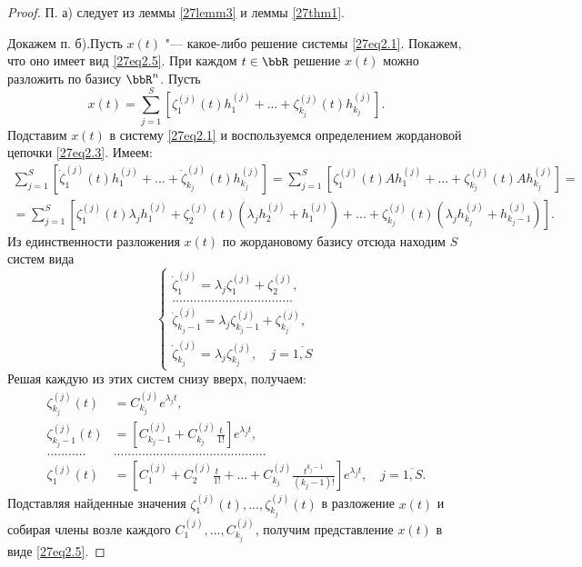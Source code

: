 \begin{proof}
П. а) следует из леммы \ref{27lemm3} и леммы \ref{27thm1}. 

Докажем п. б).Пусть $x(t)$ "--- какое-либо решение системы \eqref{27eq2.1}. Покажем, что оно имеет вид \eqref{27eq2.5}. При каждом $t\in\bbR$ решение $x(t)$ можно разложить по базису $\bbR^n$. Пусть
$$
x(t)=\sum\limits_{j=1}^S\left[\zeta_1^{(j)}(t)h_1^{(j)}+...+\zeta_{k_j}^{(j)}(t)h_{k_j}^{(j)}\right].
$$
Подставим $x(t)$ в систему \eqref{27eq2.1} и воспользуемся определением жордановой цепочки \eqref{27eq2.3}. Имеем:
\begin{multline*}
\sum\limits_{j=1}^S\left[\dot\zeta_1^{(j)}(t)h_1^{(j)}+...+\dot\zeta_{k_j}^{(j)}(t)h_{k_j}^{(j)}\right]=\sum\limits_{j=1}^S\left[\zeta_1^{(j)}(t)Ah_1^{(j)}+...+\zeta_{k_j}^{(j)}(t)Ah_{k_j}^{(j)}\right]=\\=\sum\limits_{j=1}^S\left[\zeta_1^{(j)}(t)\lambda_jh_1^{(j)}+\zeta_2^{(j)}(t)\left(\lambda_jh_2^{(j)}+h_1^{(j)}\right)+...+\zeta_{k_j}^{(j)}(t)\left(\lambda_jh_{k_j}^{(j)}+h_{k_j-1}^{(j)}\right)\right].
\end{multline*}
Из единственности разложения $x(t)$ по жордановому базису отсюда находим $S$ систем вида
$$
\begin{cases}
\dot{\zeta}_1^{(j)}=\lambda_j\zeta_1^{(j)}+\zeta_2^{(j)},\\
..................................\\
\dot{\zeta}_{k_j-1}^{(j)}=\lambda_j\zeta_{k_j-1}^{(j)}+\zeta_{k_j}^{(j)},\\
\dot{\zeta}_{k_j}^{(j)}=\lambda_j\zeta_{k_j}^{(j)},\quad j=\overline{1,S}
\end{cases}
$$
Решая каждую из этих систем снизу вверх, получаем:
$$
\begin{aligned}
\zeta_{k_j}^{(j)}(t)&=C_{k_j}^{(j)}e^{\lambda_jt},\\
\zeta_{k_j-1}^{(j)}(t)&=\left[C_{k_j-1}^{(j)}+C_{k_j}^{(j)}\frac{t}{1!}\right]e^{\lambda_j t},\\
...........&...........................................\\
\zeta_1^{(j)}(t)&=\left[C_1^{(j)}+C_2^{(j)}\frac{t}{1!}+...+C_{k_j}^{(j)}\frac{t^{k_j-1}}{(k_j-1)!}\right]e^{\lambda_jt},\quad j=\overline{1,S}.
\end{aligned}
$$
Подставляя найденные значения $\zeta_1^{(j)}(t),...,\zeta_{k_j}^{(j)}(t)$ в разложение $x(t)$ и собирая члены возле каждого $C_1^{(j)},...,C_{k_j}^{(j)}$, получим представление $x(t)$ в виде \eqref{27eq2.5}.
\end{proof}







